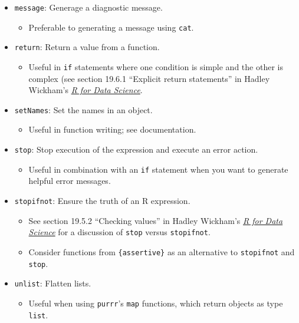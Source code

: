 \documentclass[]{book}
\providecommand{\tightlist}{%
  \setlength{\itemsep}{0pt}\setlength{\parskip}{0pt}}
\begin{document}
\begin{itemize}
\tightlist
\item
  \texttt{message}: Generage a diagnostic message.

  \begin{itemize}
  \tightlist
  \item
    Preferable to generating a message using \texttt{cat}.
  \end{itemize}
\item
  \texttt{return}: Return a value from a function.

  \begin{itemize}
  \tightlist
  \item
    Useful in \texttt{if} statements where one condition is simple and the other is complex (see section 19.6.1 ``Explicit return statements'' in Hadley Wickham's \href{https://r4ds.had.co.nz/functions.html}{\emph{R for Data Science}}.
  \end{itemize}
\item
  \texttt{setNames}: Set the names in an object.

  \begin{itemize}
  \tightlist
  \item
    Useful in function writing; see documentation.
  \end{itemize}
\item
  \texttt{stop}: Stop execution of the expression and execute an error action.

  \begin{itemize}
  \tightlist
  \item
    Useful in combination with an \texttt{if} statement when you want to generate helpful error messages.
  \end{itemize}
\item
  \texttt{stopifnot}: Ensure the truth of an R expression.

  \begin{itemize}
  \tightlist
  \item
    See section 19.5.2 ``Checking values'' in Hadley Wickham's \href{https://r4ds.had.co.nz/functions.html}{\emph{R for Data Science}} for a discussion of \texttt{stop} versus \texttt{stopifnot}.
  \item
    Consider functions from \texttt{\{assertive\}} as an alternative to \texttt{stopifnot} and \texttt{stop}.
  \end{itemize}
\item
  \texttt{unlist}: Flatten lists.

  \begin{itemize}
  \tightlist
  \item
    Useful when using \texttt{purrr}'s \texttt{map} functions, which return objects as type \texttt{list}.
  \end{itemize}
\end{itemize}
\end{document}
